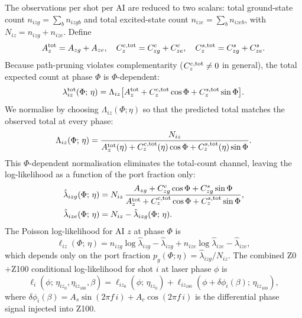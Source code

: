 \documentclass[11pt,a4paper]{article}
\begin{document}
The observations per shot per AI are reduced to two scalars: total
ground-state count $n_{izg}=\sum_b n_{izgb}$ and total excited-state count
$n_{ize}=\sum_b n_{izeb}$, with $N_{iz}=n_{izg}+n_{ize}$.  Define
\begin{equation}
  A^{\rm tot}_z=A_{zg}+A_{ze},\quad
  C^{c,\rm tot}_z=C^c_{zg}+C^c_{ze},\quad
  C^{s,\rm tot}_z=C^s_{zg}+C^s_{ze}.
\end{equation}
Because path-pruning violates complementarity ($C^{c,\rm tot}_z\neq0$ in
general), the total expected count at phase $\Phi$ is $\Phi$-dependent:
\begin{equation}
  \lambda^{\rm tot}_{iz}(\Phi;\,\eta)
  = \Lambda_{iz}\bigl[A^{\rm tot}_z+C^{c,\rm tot}_z\cos\Phi
    +C^{s,\rm tot}_z\sin\Phi\bigr].
  \label{eq:lambda_tot}
\end{equation}
We normalise by choosing $\Lambda_{iz}(\Phi;\eta)$ so that the predicted total
matches the observed total at every phase:
\begin{equation}
  \Lambda_{iz}(\Phi;\,\eta)
  = \frac{N_{iz}}{A^{\rm tot}_z(\eta)+C^{c,\rm tot}_z(\eta)\cos\Phi
    +C^{s,\rm tot}_z(\eta)\sin\Phi}.
  \label{eq:Lphi}
\end{equation}
This $\Phi$-dependent normalisation eliminates the total-count channel,
leaving the log-likelihood as a function of the port fraction only:
\begin{align}
  \hat\lambda_{izg}(\Phi;\,\eta)
  &= N_{iz}\,\frac{A_{zg}+C^c_{zg}\cos\Phi+C^s_{zg}\sin\Phi}
    {A^{\rm tot}_z+C^{c,\rm tot}_z\cos\Phi+C^{s,\rm tot}_z\sin\Phi},
  \label{eq:lam_g_normed}\\
  \hat\lambda_{ize}(\Phi;\,\eta)
  &= N_{iz}-\hat\lambda_{izg}(\Phi;\,\eta).
\end{align}
The Poisson log-likelihood for AI $z$ at phase $\Phi$ is
\begin{equation}
  \ell_{iz}(\Phi;\,\eta)
  = n_{izg}\log\hat\lambda_{izg}
    -\hat\lambda_{izg}
    +n_{ize}\log\hat\lambda_{ize}
    -\hat\lambda_{ize},
  \label{eq:ll_ai}
\end{equation}
which depends only on the port fraction $p_g(\Phi;\eta)=\hat\lambda_{izg}/N_{iz}$.
The combined Z0$+$Z100 conditional log-likelihood for shot $i$ at laser phase
$\phi$ is
\begin{equation}
  \ell_i(\phi;\,\eta_{iz_0},\eta_{iz_{100}},\beta)
  = \ell_{iz_0}(\phi;\,\eta_{iz_0})
  +\ell_{iz_{100}}(\phi+\delta\phi_i(\beta);\,\eta_{iz_{100}}),
  \label{eq:ll_combined}
\end{equation}
where $\delta\phi_i(\beta)=A_s\sin(2\pi f\,i)+A_c\cos(2\pi f\,i)$ is the
differential phase signal injected into Z100.
\end{document}
